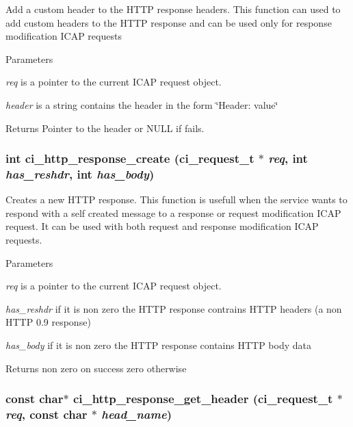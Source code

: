 Add a custom header to the HTTP response headers. This function can used to add custom headers to the HTTP response and can be used only for response modification ICAP requests 
\begin{DoxyParams}{Parameters}
\item[{\em req}]is a pointer to the current ICAP request object. \item[{\em header}]is a string contains the header in the form \char`\"{}Header: value\char`\"{} \end{DoxyParams}
\begin{DoxyReturn}{Returns}
Pointer to the header or NULL if fails. 
\end{DoxyReturn}
\hypertarget{group__HTTP_gaad9f358ca7cd20aeca59b954b0d69a02}{
\subsubsection[{ci\_\-http\_\-response\_\-create}]{\setlength{\rightskip}{0pt plus 5cm}int ci\_\-http\_\-response\_\-create ({\bf ci\_\-request\_\-t} $\ast$ {\em req}, \/  int {\em has\_\-reshdr}, \/  int {\em has\_\-body})}}
\label{group__HTTP_gaad9f358ca7cd20aeca59b954b0d69a02}


Creates a new HTTP response. This function is usefull when the service wants to respond with a self created message to a response or request modification ICAP request. It can be used with both request and response modification ICAP requests. 
\begin{DoxyParams}{Parameters}
\item[{\em req}]is a pointer to the current ICAP request object. \item[{\em has\_\-reshdr}]if it is non zero the HTTP response contrains HTTP headers (a non HTTP 0.9 response) \item[{\em has\_\-body}]if it is non zero the HTTP response contains HTTP body data \end{DoxyParams}
\begin{DoxyReturn}{Returns}
non zero on success zero otherwise 
\end{DoxyReturn}
\hypertarget{group__HTTP_ga250fece2ce100062dc38b24e540cf597}{
\subsubsection[{ci\_\-http\_\-response\_\-get\_\-header}]{\setlength{\rightskip}{0pt plus 5cm}const char$\ast$ ci\_\-http\_\-response\_\-get\_\-header ({\bf ci\_\-request\_\-t} $\ast$ {\em req}, \/  const char $\ast$ {\em head\_\-name})}}
\label{group__HTTP_ga250fece2ce100062dc38b24e540cf597}


